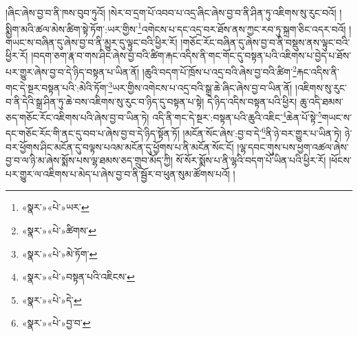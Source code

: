 །ཞིང་ཞེས་བྱ་བ་ནི་ཁས་བུབ་ཏུའོ། །སེར་བ་དྲག་པོ་འབབ་པ་འདྲ་ཞིང་ཞེས་བྱ་བ་ནི་ཤིན་ཏུ་འཇིགས་སུ་རུང་བའོ། །སྨྱིག་མའི་ཚལ་མེས་ཚིག་སྟེ་ཏོག་:ཡར་གྱིས་\footnote{«སྣར་»«པེ་»ཡར་}འགེངས་པ་དང་འདྲ་བར་ཐོས་ནས་ཀྱང་རབ་ཏུ་སྐྲག་ཅིང་འདར་བའོ། །གཡང་ས་བཞིན་དུ་ཞེས་བྱ་བ་ནི་མྱུར་དུ་ལྟུང་བའི་ཕྱིར་རོ། །གཅོང་རོང་བཞིན་དུ་ཞེས་བྱ་བ་ནི་བསྡུས་ནས་ལྟུང་བའི་ཕྱིར་རོ། །བདག་ཅག་རྣ་བ་གས་ཤིང་ཞེས་བྱ་བའི་ཚིག་རྐང་འདིས་ནི་གང་གོང་དུ་བསྟན་པའི་འཇིགས་པ་བྱེད་པ་ཐོས་པར་གྱུར་ཞེས་བྱ་བ་དེ་ཉིད་བསྟན་པ་ཡིན་ནོ། །ཆུའི་བདག་པོ་ཁྲོས་པ་འདྲ་བའི་ཞེས་བྱ་བའི་ཚིག་\footnote{«སྣར་»«པེ་»ཚིགས་}རྐང་འདིས་ནི་གང་དེ་སྔར་བསྟན་པའི་:མེའི་ཏོག་\footnote{«སྣར་»«པེ་»མེ་ཏོག་}ཡར་གྱིས་འགེངས་པ་འདྲ་བའི་སྒྲ་ཆེ་ཞིང་ཞེས་བྱ་བ་ཡིན་ནོ། །འཇིགས་སུ་རུང་བ་ནི་དེའི་སྒྲ་ཤིན་ཏུ་ཆེ་བས་འཇིགས་སུ་རུང་བ་ཉིད་དུ་བསྟན་པ་སྟེ། དེ་ཉིད་འདིས་བསྟན་པའི་ཕྱིར། ཆུ་འདི་ཐམས་ཅད་གཅོང་རོང་འཇིགས་པའི་ཞེས་བྱ་བ་ཡིན་ཏེ། འདི་ནི་གང་དེ་སྔར་:བསྟན་པའི་ཆུའི་འཇིང་\footnote{«སྣར་»«པེ་»བསྟན་པའི་འཇིངས་}ཆེན་པོ་སྟེ་\footnote{«སྣར་»«པེ་»དེ་}གཡང་ས་དང་གཅོང་རོང་གི་ནང་དུ་བབ་པ་ཞེས་བྱ་བ་དེ་ཉིད་སྟོན་ཏོ། །མངོན་སོང་ཞེས་:བྱ་བ་དེ་\footnote{«སྣར་»«པེ་»བྱ་བ་}ནི་ཉེ་བར་གྱུར་པ་ཡིན་ཏེ། ཉེ་བར་ཕྱོགས་ཤིང་མངོན་དུ་བལྟས་པའམ་མངོན་དུ་ཕྱོགས་པ་ནི་མངོན་སོང་ངོ། །ལྷ་དབང་གུས་པས་ཕྱག་འཚལ་ཞེས་བྱ་བ་ལ་ཉི་མ་ཞེས་སྨོས་པས་ལྷ་ཐམས་ཅད་གྲུབ་མོད་ཀྱི། སོ་སོར་སྨོས་པ་ནི་ལྷའི་བདག་པོ་ཡིན་པའི་ཕྱིར་རོ། །ཕོངས་པར་གྱུར་ལ་འཇིགས་པ་མེད་པ་ཞེས་བྱ་བ་ནི་སྦྱོར་བ་ཕུན་སུམ་ཚོགས་པའོ། །
